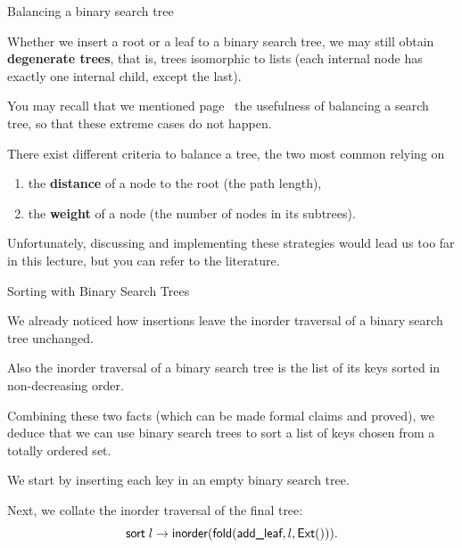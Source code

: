 %
\begin{frame}{Balancing a binary search tree}

  Whether we insert a root or a leaf to a binary search tree, we may
  still obtain \textbf{degenerate trees}, that is, trees isomorphic to
  lists (each internal node has exactly one internal child, except the
  last).

  \bigskip

  You may recall that we mentioned page~\pageref{frame:balanced} the
  usefulness of balancing a search tree, so that these extreme cases
  do not happen.

  \bigskip

  There exist different criteria to balance a tree, the two most
  common relying on
  \begin{enumerate}

    \item the \textbf{distance} of a node to the root (the path
      length),

    \item the \textbf{weight} of a node (the number of nodes in its
      subtrees).

  \end{enumerate}

  Unfortunately, discussing and implementing these strategies would
  lead us too far in this lecture, but you can refer to the
  literature.

\end{frame}

%
\begin{frame}{Sorting with Binary Search Trees}

  We already noticed how insertions leave the inorder traversal of a
  binary search tree unchanged.

  \bigskip

  Also the inorder traversal of a binary search tree is the list of
  its keys sorted in non\hyp{}decreasing order.

  \bigskip

  Combining these two facts (which can be made formal claims and
  proved), we deduce that we can use binary search trees to sort a
  list of keys chosen from a totally ordered set.

  \bigskip

  We start by inserting each key in an empty binary search tree.

  \bigskip

  Next, we collate the inorder traversal of the final tree:
  \begin{equation*}
    \textsf{sort}\; l \rightarrow \textsf{inorder} (\textsf{fold}(\textsf{add\_leaf}, l, \textsf{Ext}())).
  \end{equation*}

\end{frame}
